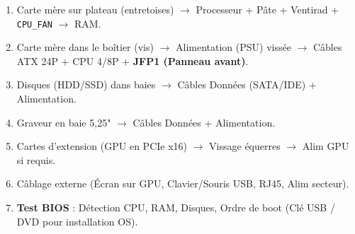 \documentclass[11pt]{article}
\begin{document}
\begin{aretenir}
\begin{enumerate}
\item Carte mère sur plateau (entretoises) $\rightarrow$ Processeur + Pâte + Ventirad + \texttt{CPU\_FAN} $\rightarrow$ RAM.
\item Carte mère dans le boîtier (vis) $\rightarrow$ Alimentation (PSU) vissée $\rightarrow$ Câbles ATX 24P + CPU 4/8P + \textbf{JFP1 (Panneau avant)}.
\item Disques (HDD/SSD) dans baies $\rightarrow$ Câbles Données (SATA/IDE) + Alimentation.
\item Graveur en baie 5,25" $\rightarrow$ Câbles Données + Alimentation.
\item Cartes d'extension (GPU en PCIe x16) $\rightarrow$ Vissage équerres $\rightarrow$ Alim GPU si requis.
\item Câblage externe (Écran sur GPU, Clavier/Souris USB, RJ45, Alim secteur).
\item \textbf{Test BIOS} : Détection CPU, RAM, Disques, Ordre de boot (Clé USB / DVD pour installation OS).
\end{enumerate}
\end{aretenir}
\end{document}
